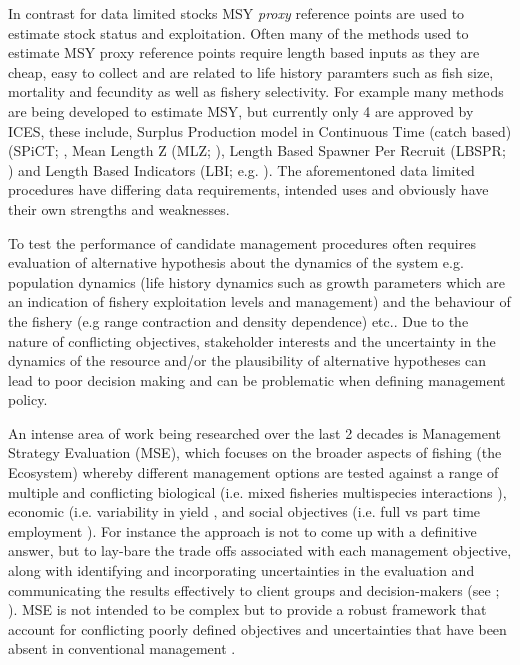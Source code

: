 \documentclass[preprint,review,12pt]{elsarticle}
\begin{document}
In contrast for data limited stocks MSY \emph{proxy} reference points are used to estimate stock status and exploitation.  Often many of the methods used to estimate MSY proxy reference points require length based inputs as they are cheap, easy to collect \cite{quinn1999quantitative} and are related to life history paramters such as fish size, mortality and fecundity as well as fishery selectivity. For example many methods are being developed to estimate MSY, but currently only 4 are approved by ICES, these include, Surplus Production model in Continuous Time (catch based) (SPiCT; \cite{pedersen2017stochastic}, Mean Length Z (MLZ; \cite{gedamke2006estimating}), Length Based Spawner Per Recruit (LBSPR; \cite{hordyk2014some}) and Length Based Indicators (LBI; e.g. \cite{probst2013indicator}). The aforementoned data limited procedures have differing data requirements, intended uses and obviously have their own strengths and weaknesses. 

To test the performance of candidate management procedures often requires evaluation of alternative hypothesis about the dynamics of the system e.g. population dynamics (life history dynamics such as growth parameters which are an indication of fishery exploitation levels and management) and the behaviour of the fishery (e.g range contraction and density dependence) etc.. Due to the nature of conflicting objectives, stakeholder interests and the uncertainty in the dynamics of the resource and/or the plausibility of alternative hypotheses can lead to poor decision making and can be problematic when defining management policy.

An intense area of work being researched over the last 2 decades is Management Strategy Evaluation (MSE), which focuses on the broader aspects of fishing (the Ecosystem) whereby different management options are tested against a range of multiple and conflicting biological (i.e. mixed fisheries multispecies interactions \cite{blanchard2014evaluating}), economic (i.e. variability in yield \cite{smith2011impacts}, and social objectives (i.e. full vs part time employment \cite{plaganyi2013integrating}). For instance the approach is not to come up with a definitive answer, but to lay-bare the trade offs associated with each management objective, along with identifying and incorporating uncertainties in the evaluation and communicating the results effectively to client groups and decision-makers (see \cite{kell2007flr}; \cite{punt2015strategic}). MSE is not intended to be complex but to provide a robust framework that account for conflicting poorly defined objectives and uncertainties that have been absent in conventional management \cite{kell2007flr}. 
\end{document}
